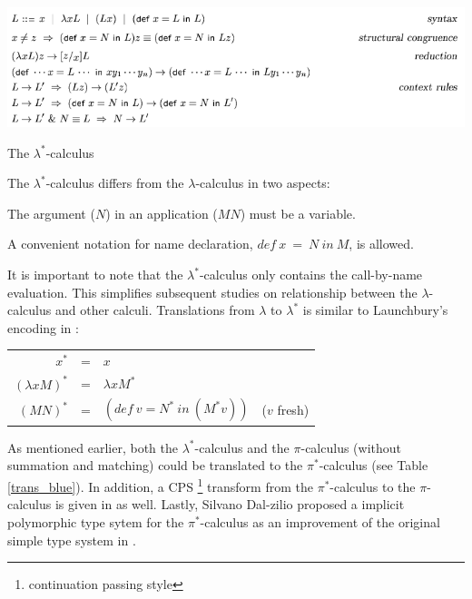 \begin{table} [h]
  \begin{center}
  \includegraphics[scale=0.5]{lambda_star.png}
  \end{center}
  \caption{The $\lambda ^*$-calculus}
  \label{lambda_star}
\end{table}

The $\lambda^*$-calculus differs from the $\lambda$-calculus in two aspects:
\begin{inparaenum}[(i)]
  \item The argument ($N$) in an application ($M N$) must be a variable.
  \item A convenient notation for name declaration, $def\ x\ =\ N\ in\ M$, is allowed.
\end{inparaenum}
It is important to note that the $\lambda^*$-calculus only contains the call-by-name evaluation.  This simplifies subsequent studies on relationship between the $\lambda$-calculus and other calculi.  Translations from $\lambda$ to $\lambda^*$ is similar to Launchbury's encoding in \cite{Launchbury93anatural}:

\begin{center}
  \begin{tabular}{ r c l  c}
$x^*$&=&$x$&\\
$(\lambda xM)^*$&=&$\lambda xM^*$&\\
$(M N)^*$&=&$(def\ v = N^*\ in\ (M^*v))$&($v$ fresh)\\
  \end{tabular}
\end{center}

As mentioned earlier, both the $\lambda^*$-calculus and the $\pi$-calculus (without summation and matching) could be translated to the  $\pi^*$-calculus (see Table \ref{trans_blue}).  In addition, a CPS \footnote{continuation passing style} transform from the $\pi^*$-calculus to the $\pi$-calculus is given in \cite{Blue} as well.  Lastly, Silvano Dal-zilio \cite{Dal-Zilio97implicitpolymorphic} proposed a implicit polymorphic type sytem for the $\pi^*$-calculus as an improvement of the original simple type system in \cite{Blue}.

